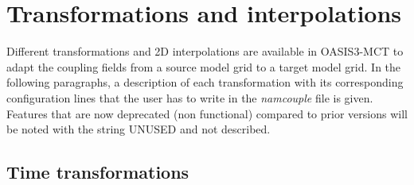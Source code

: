 \newpage
\chapter{Transformations and interpolations}
\label{sec_transformations}

Different transformations and 2D interpolations are available in
OASIS3-MCT to adapt the coupling fields from a source model grid to a
target model grid.  In the following paragraphs, a description of each
transformation with its corresponding configuration lines that the
user has to write in the {\it namcouple} file is given.  Features that
are now deprecated (non functional) compared to prior versions will be
noted with the string UNUSED and not described.

\section{Time transformations}
\label{subsec_timetrans}

